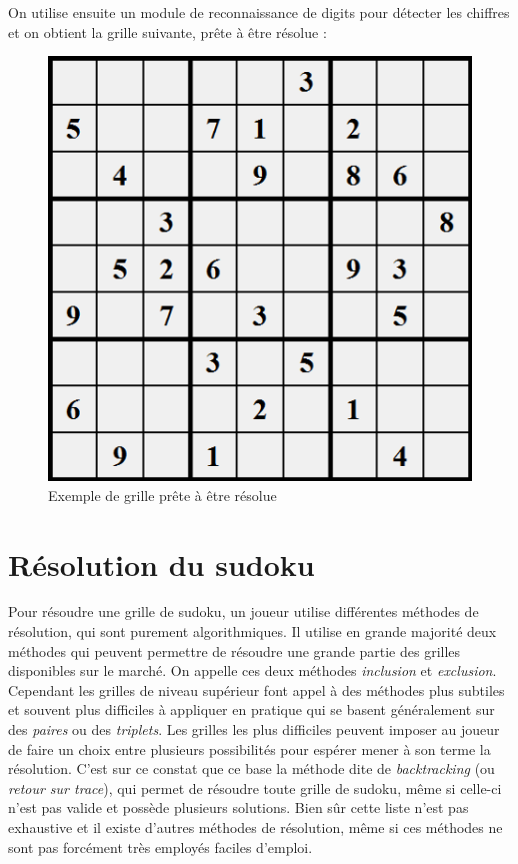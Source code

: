 \documentclass[12pt,a4paper]{report}
\begin{document}
On utilise ensuite un module de reconnaissance de digits pour détecter les chiffres et on obtient la grille suivante, prête à être résolue :

\begin{figure}[!h]
 \center
 \includegraphics[scale=0.55]{../pictures/finished.png}
 \caption{Exemple de grille prête à être résolue}
\end{figure}

\newpage
\section{Résolution du sudoku}
\label{Resolution}
Pour résoudre une grille de sudoku, un joueur utilise différentes méthodes de résolution, qui sont purement algorithmiques. Il utilise en grande majorité deux méthodes qui peuvent permettre de résoudre une grande partie des grilles disponibles sur le marché. On appelle ces deux méthodes \emph{inclusion} et \emph{exclusion}. Cependant les grilles de niveau supérieur font appel à des méthodes plus subtiles et souvent plus difficiles à appliquer en pratique qui se basent généralement sur des \emph{paires} ou des \emph{triplets}. Les grilles les plus difficiles peuvent imposer au joueur de faire un choix entre plusieurs possibilités pour espérer mener à son terme la résolution. C'est sur ce constat que ce base la méthode dite de \emph{backtracking} (ou \emph{retour sur trace}), qui permet de résoudre toute grille de sudoku, même si celle-ci n'est pas valide et possède plusieurs solutions. Bien sûr cette liste n'est pas exhaustive et il existe d'autres méthodes de résolution, même si ces méthodes ne sont pas forcément très employés faciles d'emploi.
\end{document}
